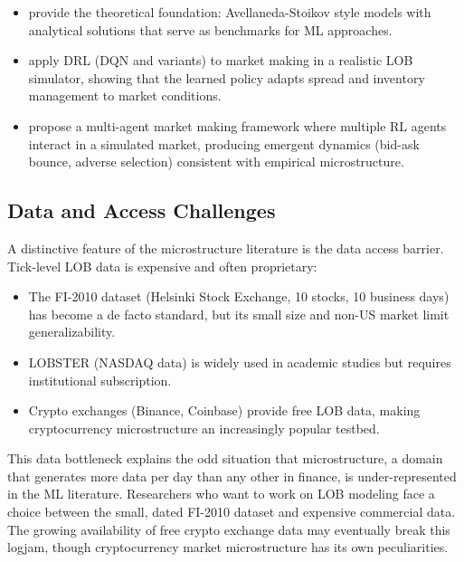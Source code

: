 \begin{itemize}[leftmargin=*]
    \item \citet{Gueant2017} provide the theoretical foundation: Avellaneda-Stoikov style models with analytical solutions that serve as benchmarks for ML approaches.

    \item \citet{Spooner2018} apply DRL (DQN and variants) to market making in a realistic LOB simulator, showing that the learned policy adapts spread and inventory management to market conditions.

    \item \citet{Gasperov2021} propose a multi-agent market making framework where multiple RL agents interact in a simulated market, producing emergent dynamics (bid-ask bounce, adverse selection) consistent with empirical microstructure.
\end{itemize}

\subsection{Data and Access Challenges}

A distinctive feature of the microstructure literature is the data access barrier. Tick-level LOB data is expensive and often proprietary:

\begin{itemize}[leftmargin=*]
    \item The FI-2010 dataset \citep{Ntakaris2018} (Helsinki Stock Exchange, 10 stocks, 10 business days) has become a de facto standard, but its small size and non-US market limit generalizability.
    \item LOBSTER (NASDAQ data) is widely used in academic studies but requires institutional subscription.
    \item Crypto exchanges (Binance, Coinbase) provide free LOB data, making cryptocurrency microstructure an increasingly popular testbed.
\end{itemize}

This data bottleneck explains the odd situation that microstructure, a domain that generates more data per day than any other in finance, is under-represented in the ML literature. Researchers who want to work on LOB modeling face a choice between the small, dated FI-2010 dataset and expensive commercial data. The growing availability of free crypto exchange data may eventually break this logjam, though cryptocurrency market microstructure has its own peculiarities.
